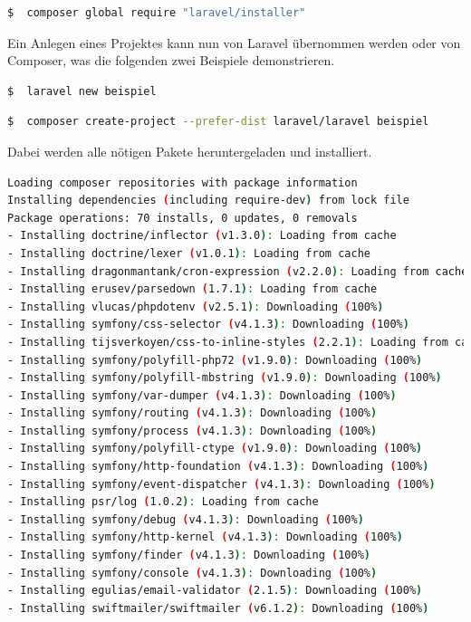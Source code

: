 \begin{lstlisting}[language=sh, frame=single]
$  composer global require "laravel/installer"
\end{lstlisting}

Ein Anlegen eines Projektes kann nun von Laravel übernommen werden oder von Composer, was die folgenden zwei Beispiele demonstrieren.

\begin{lstlisting}[language=sh, frame=single]
$  laravel new beispiel
\end{lstlisting}

\begin{lstlisting}[language=sh, frame=single]
$  composer create-project --prefer-dist laravel/laravel beispiel
\end{lstlisting}

Dabei werden alle nötigen Pakete heruntergeladen und installiert.
\begin{lstlisting}[language=sh, frame=single]
Loading composer repositories with package information
Installing dependencies (including require-dev) from lock file
Package operations: 70 installs, 0 updates, 0 removals
- Installing doctrine/inflector (v1.3.0): Loading from cache
- Installing doctrine/lexer (v1.0.1): Loading from cache
- Installing dragonmantank/cron-expression (v2.2.0): Loading from cache
- Installing erusev/parsedown (1.7.1): Loading from cache
- Installing vlucas/phpdotenv (v2.5.1): Downloading (100%)
- Installing symfony/css-selector (v4.1.3): Downloading (100%)
- Installing tijsverkoyen/css-to-inline-styles (2.2.1): Loading from cache
- Installing symfony/polyfill-php72 (v1.9.0): Downloading (100%)
- Installing symfony/polyfill-mbstring (v1.9.0): Downloading (100%)
- Installing symfony/var-dumper (v4.1.3): Downloading (100%)
- Installing symfony/routing (v4.1.3): Downloading (100%)
- Installing symfony/process (v4.1.3): Downloading (100%)
- Installing symfony/polyfill-ctype (v1.9.0): Downloading (100%)
- Installing symfony/http-foundation (v4.1.3): Downloading (100%)
- Installing symfony/event-dispatcher (v4.1.3): Downloading (100%)
- Installing psr/log (1.0.2): Loading from cache
- Installing symfony/debug (v4.1.3): Downloading (100%)
- Installing symfony/http-kernel (v4.1.3): Downloading (100%)
- Installing symfony/finder (v4.1.3): Downloading (100%)
- Installing symfony/console (v4.1.3): Downloading (100%)
- Installing egulias/email-validator (2.1.5): Downloading (100%)
- Installing swiftmailer/swiftmailer (v6.1.2): Downloading (100%)
\end{lstlisting}

